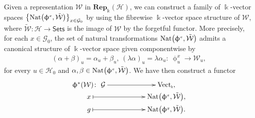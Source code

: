 \documentclass[pdftex]{sigma}
\numberwithin{equation}{section}
\newcommand{\Rep}[1]{\mathbf{Rep}_{\Sscript{\Bbbk}}(#1)}
\newcommand{\Vect}{{\rm Vect}_{\Sscript{\Bbbk}}}
\newcommand{\Go}{\cG_{\Sscript{0}}}
\newcommand{\Ho}{\cH_{\Sscript{0}}}
\newcommand{\Wu}{\cW_{\Sscript{u}}}
\newcommand{\cG}{{\mathcal G}}
\newcommand{\cH}{{\mathcal H}}
\newcommand{\cW}{{\mathcal W}}
\newcommand{\phix}{\upphi^{\Sscript{x}}}
\newcommand{\Sets}{\mathsf{Sets}}
\newcommand{\Sscript}[1]{\scriptscriptstyle{#1}}
\begin{document}
 Given a representation $\cW$ in $\Rep{\cH}$, we can construct a family of $\Bbbk$-vector spaces \linebreak $ \big\{ {\rm Nat}\big(\phix, \tilde{\cW}\big) \big\}_{x \in \Go}$ by using the fibrewise $\Bbbk$-vector space structure of $\cW$, where $\tilde{\cW}\colon \cH \to \Sets$ is the image of $\cW$ by the forgetful functor. More precisely, for each $x \in \Go$, the set of natural transformations ${\rm Nat}\big(\phix,\tilde{\cW}\big)$ admits a canonical structure of $\Bbbk$-vector space given componentwise by
\begin{gather*}
(\alpha+ \beta)_{u} =\alpha_u + \beta_u,\ (\lambda \alpha)_{u}= \lambda \alpha_u \colon \ \phix_{\Sscript{u}} \longrightarrow \Wu,
\end{gather*}
for every $u \in \Ho$ and $\alpha, \beta \in {\rm Nat}\big(\phix, \tilde{\cW}\big)$. We have then construct a functor
\begin{gather}\label{Eq:Phistarup}
\begin{gathered}
\xymatrix@R=0pt{ \upphi^*(\cW) \colon \ \cG \ar@{->}^-{}[rr] & & \Vect, \\ x \ar@{|->}^-{}[rr] & & {\rm Nat}\big(\phix, \tilde{\cW}\big), \\ g \ar@{|->}[rr] & & {\rm Nat}\big(\upphi^{\Sscript{g}}, \tilde{\cW}\big). }
\end{gathered}
\end{gather}
\end{document}
